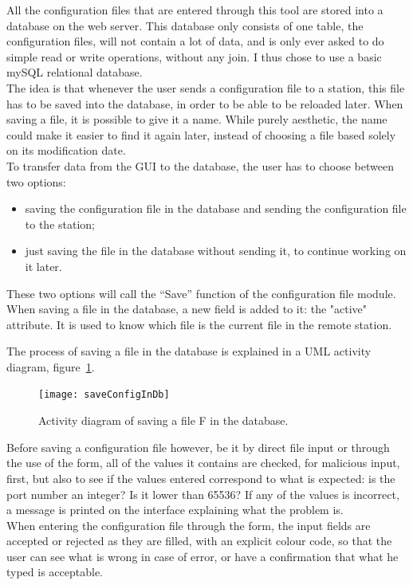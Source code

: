 \documentclass{themeensg}
\begin{document}
All the configuration files that are entered through this tool are stored into a database on the web server. This database only consists of one table, the configuration files, will not contain a lot of data, and is only ever asked to do simple read or write operations, without any join. I thus chose to use a basic mySQL relational database.\\

The idea is that whenever the user sends a configuration file to a station, this file has to be saved into the database, in order to be able to be reloaded later. When saving a file, it is possible to give it a name. While purely aesthetic, the name could make it easier to find it again later, instead of choosing a file based solely on its modification date.\\
To transfer data from the GUI to the database, the user has to choose between two options: \begin{itemize}
\item saving the configuration file in the database and sending the configuration file to the station;
\item just saving the file in the database without sending it, to continue working on it later.
\end{itemize}
These two options will call the “Save” function of the configuration file module. When saving a file in the database, a new field is added to it: the "active" attribute. It is used to know which file is the current file in the remote station.

The process of saving a file in the database is explained in a UML activity diagram, figure~\ref{fig:saveConfig}.\\

\begin{figure}[ht]
	\centering
	\texttt{[image: saveConfigInDb]}
	\caption{Activity diagram of saving a file F in the database.}
	\label{fig:saveConfig}
\end{figure}

Before saving a configuration file however, be it by direct file input or through the use of the form, all of the values it contains are checked, for malicious input, first, but also to see if the values entered correspond to what is expected: is the port number an integer? Is it lower than 65536? If any of the values is incorrect, a message is printed on the interface explaining what the problem is.\\
When entering the configuration file through the form, the input fields are accepted or rejected as they are filled, with an explicit colour code, so that the user can see what is wrong in case of error, or have a confirmation that what he typed is acceptable. 
\end{document}
